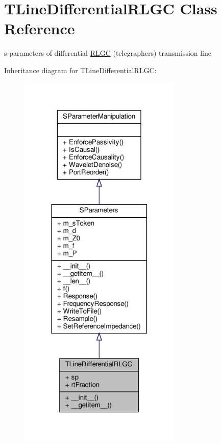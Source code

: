 \hypertarget{classSignalIntegrity_1_1SParameters_1_1Devices_1_1TLineDifferentialRLGC_1_1TLineDifferentialRLGC}{}\section{T\+Line\+Differential\+R\+L\+GC Class Reference}
\label{classSignalIntegrity_1_1SParameters_1_1Devices_1_1TLineDifferentialRLGC_1_1TLineDifferentialRLGC}


s-\/parameters of differential \hyperlink{namespaceSignalIntegrity_1_1SParameters_1_1RLGC}{R\+L\+GC} (telegrapher\textquotesingle{}s) transmission line  




Inheritance diagram for T\+Line\+Differential\+R\+L\+GC\+:
\nopagebreak
\begin{figure}[H]
\begin{center}
\leavevmode
\includegraphics[width=220pt]{classSignalIntegrity_1_1SParameters_1_1Devices_1_1TLineDifferentialRLGC_1_1TLineDifferentialRLGC__inherit__graph}
\end{center}
\end{figure}


